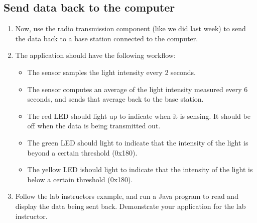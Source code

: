 \documentclass[letterpaper,12pt]{article}
\begin{document}
\subsection*{Send data back to the computer}
\begin{enumerate}
    \item Now, use the radio transmission component (like we did last week) to
          send the data back to a base station connected to the computer.
    \item The application should have the following workflow:
        \begin{itemize}
            \item The sensor samples the light intensity every 2 seconds.
            \item The sensor computes an average of the light intensity
                  measured every 6 seconds, and sends that average back
                  to the base station.
            \item The red LED should light up to indicate when it is sensing.
                  It should be off when the data is being transmitted out.
            \item The green LED should light to indicate that the intensity of
                  the light is beyond a certain threshold (0x180).
            \item The yellow LED ishould light to indicate that the intensity
                  of the light is below a certain threshold (0x180).
        \end{itemize}
    \item Follow the lab instructors example, and run a Java program to read
          and display the data being sent back. Demonstrate your application for
          the lab instructor.
\end{enumerate}
\end{document}
